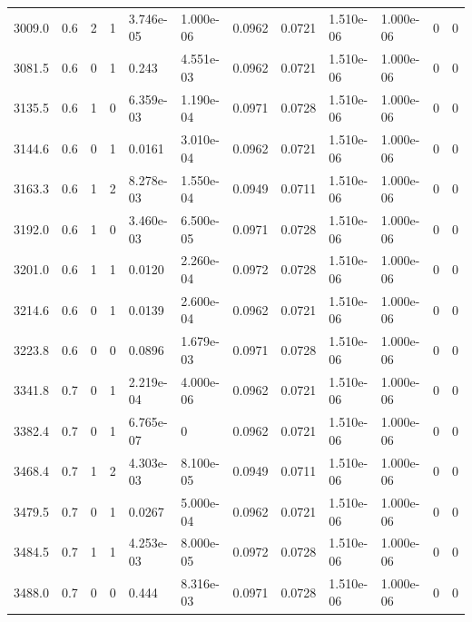 \documentclass[preview]{standalone}
\begin{document}
{{{\begin{tabular}{L{1.2cm}C{1.2cm} C{0.3cm}C{0.5cm} C{1.4cm}C{1.4cm} C{1.4cm}C{1.4cm} C{1.6cm}C{1.6cm} C{1.6cm}C{1.6cm}}
  3009.0  &   0.6  & 2     &  1 &  3.746e-05  & 1.000e-06  &  0.0962&   0.0721& 1.510e-06 & 1.000e-06   &  0 & 0  \\ 
  3081.5  &   0.6  & 0     &  1 &  0.243  & 4.551e-03  &  0.0962&   0.0721& 1.510e-06 & 1.000e-06   &  0 & 0  \\ 
  3135.5  &   0.6  & 1     &  0 &  6.359e-03  & 1.190e-04  &  0.0971&   0.0728& 1.510e-06 & 1.000e-06   &  0 & 0  \\ 
  3144.6  &   0.6  & 0     &  1 &  0.0161  & 3.010e-04  &  0.0962&   0.0721& 1.510e-06 & 1.000e-06   &  0 & 0  \\ 
  3163.3  &   0.6  & 1     &  2 &  8.278e-03  & 1.550e-04  &  0.0949&   0.0711& 1.510e-06 & 1.000e-06   &  0 & 0  \\ 
  3192.0  &   0.6  & 1     &  0 &  3.460e-03  & 6.500e-05  &  0.0971&   0.0728& 1.510e-06 & 1.000e-06   &  0 & 0  \\ 
  3201.0  &   0.6  & 1     &  1 &  0.0120  & 2.260e-04  &  0.0972&   0.0728& 1.510e-06 & 1.000e-06   &  0 & 0  \\ 
  3214.6  &   0.6  & 0     &  1 &  0.0139  & 2.600e-04  &  0.0962&   0.0721& 1.510e-06 & 1.000e-06   &  0 & 0  \\ 
  3223.8  &   0.6  & 0     &  0 &  0.0896  & 1.679e-03  &  0.0971&   0.0728& 1.510e-06 & 1.000e-06   &  0 & 0  \\ 
  3341.8  &   0.7  & 0     &  1 &  2.219e-04  & 4.000e-06  &  0.0962&   0.0721& 1.510e-06 & 1.000e-06   &  0 & 0  \\ 
  3382.4  &   0.7  & 0     &  1 &  6.765e-07  & 0  &  0.0962&   0.0721& 1.510e-06 & 1.000e-06   &  0 & 0  \\ 
  3468.4  &   0.7  & 1     &  2 &  4.303e-03  & 8.100e-05  &  0.0949&   0.0711& 1.510e-06 & 1.000e-06   &  0 & 0  \\ 
  3479.5  &   0.7  & 0     &  1 &  0.0267  & 5.000e-04  &  0.0962&   0.0721& 1.510e-06 & 1.000e-06   &  0 & 0  \\ 
  3484.5  &   0.7  & 1     &  1 &  4.253e-03  & 8.000e-05  &  0.0972&   0.0728& 1.510e-06 & 1.000e-06   &  0 & 0  \\ 
  3488.0  &   0.7  & 0     &  0 &  0.444  & 8.316e-03  &  0.0971&   0.0728& 1.510e-06 & 1.000e-06   &  0 & 0  \\ 
\hline 
\end{tabular} 

}}}
\end{document}
